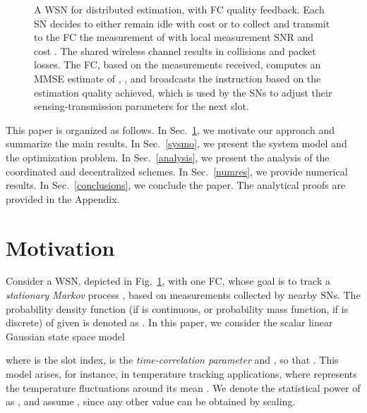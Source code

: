 \documentclass[10pt,twocolumn,twoside]{IEEEtran}
\theoremstyle{plain}
\begin{document}
\begin{figure}
{}
\vspace{-3mm}
\caption{A WSN for distributed estimation, with FC quality feedback.
Each SN decides to either remain idle with cost  or to collect and transmit to the FC the measurement  of  with local measurement SNR  and cost . The shared wireless channel results in collisions and packet losses. The FC, 
based on the measurements received, computes an MMSE estimate of , , and broadcasts the instruction  based on the estimation quality 
achieved,
which is used by the SNs to adjust their sensing-transmission parameters for the next slot.}\label{fig:WSN}
\vspace{-5mm}
\end{figure}

 This paper is organized as follows.
  In Sec.~\ref{probform}, we motivate our approach and summarize the main results.
  In Sec.~\ref{sysmo}, we present the system model and the optimization problem.
 In Sec.~\ref{analysis}, we present
 the analysis of the coordinated and decentralized schemes.
In Sec.~\ref{numres}, we provide numerical results.
In Sec.~\ref{conclusions}, we conclude the paper.
The analytical proofs are provided in the Appendix.
\vspace{-0.3cm}
\section{Motivation}
\label{probform}
 Consider a WSN, depicted in Fig.~\ref{fig:WSN}, with one FC, whose goal
 is to track a \emph{stationary Markov} process ,
 based on measurements collected  by  nearby SNs.
 The probability density function (if  is continuous, or probability mass function, if  is discrete) of  given  is denoted as 
 . In this paper, we consider the  scalar linear Gaussian state space model

where  is the slot index,
  is the \emph{time-correlation parameter}  and ,
 so that .
 This model arises, for instance, in temperature tracking applications, where  represents the temperature fluctuations around its mean \cite{Tandeo}.
 We denote the statistical power of  as ,
 and assume  , since any other value can be obtained by scaling.
 
\end{document}
